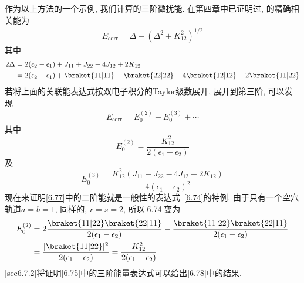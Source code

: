 作为以上方法的一个示例, 
我们计算的三阶微扰能. 
在第四章中已证明过, 
的精确相关能为
\begin{align}
E_\mathrm{corr} = \Delta - (\Delta^2 + K_{12}^2)^{1/2}
\label{6.76}
\end{align}
其中
\begin{align*}
2\Delta & = 2(\epsilon_2-\epsilon_1) + J_{11} + J_{22} - 4J_{12} + 2K_{12}\\
        & = 2(\epsilon_2-\epsilon_1) + \braket{11|11} + \braket{22|22} - 4\braket{12|12} + 2\braket{11|22}
\end{align*}
若将上面的关联能表达式按双电子积分的Taylor级数展开, 
展开到第三阶, 
可以发现
\begin{align*}
E_\mathrm{corr}  = E_0^{(2)} + E_0^{(3)} + \cdots
\end{align*}
其中
\begin{equation}
E_0^{(2)} = \frac{K_{12}^2}{2(\epsilon_1-\epsilon_2)}
\label{6.77}
\end{equation}
及
\begin{equation}
E_0^{(3)} = \frac{K_{12}^2(J_{11}+J_{22}-4J_{12}+2K_{12})}{4(\epsilon_1-\epsilon_2)^2}
\label{6.78}
\end{equation}
现在来证明\autoref{6.77}中的二阶能就是一般性的表达式~\eqref{6.74}的特例. 
由于只有一个空穴轨道$a=b=1$, 
 同样的, 
$r=s=2$, 
所以\autoref{6.74}变为
\begin{align*}
E_0^{(2)} & = 2\frac{\braket{11|22}\braket{22|11}}{2(\epsilon_1-\epsilon_2)} - \frac{\braket{11|22}\braket{22|11}}{2(\epsilon_1-\epsilon_2)} \\
          & = \frac{|\braket{11|22}|^2}{2(\epsilon_1-\epsilon_2)} = \frac{K_{12}^2}{2(\epsilon_1-\epsilon_2)}
\end{align*}
\autoref{sec6.7.2}将证明\autoref{6.75}中的三阶能量表达式可以给出\autoref{6.78}中的结果.

